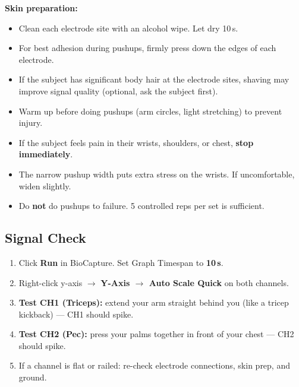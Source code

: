 \documentclass[11pt,letterpaper]{article}
\begin{document}
\textbf{Skin preparation:}
\begin{itemize}[nosep]
    \item Clean each electrode site with an alcohol wipe.  Let dry 10\,s.
    \item For best adhesion during pushups, firmly press down the edges of each electrode.
    \item If the subject has significant body hair at the electrode sites, shaving may improve signal quality (optional, ask the subject first).
\end{itemize}

\begin{warningbox}
\begin{itemize}[nosep]
    \item Warm up before doing pushups (arm circles, light stretching) to prevent injury.
    \item If the subject feels pain in their wrists, shoulders, or chest, \textbf{stop immediately}.
    \item The narrow pushup width puts extra stress on the wrists.  If uncomfortable, widen slightly.
    \item Do \textbf{not} do pushups to failure.  5 controlled reps per set is sufficient.
\end{itemize}
\end{warningbox}

\subsection{Signal Check}

\begin{enumerate}[nosep]
    \item Click \textbf{Run} in BioCapture.  Set Graph Timespan to \textbf{10\,s}.
    \item Right-click y-axis $\rightarrow$ \textbf{Y-Axis $\rightarrow$ Auto Scale Quick} on both channels.
    \item \textbf{Test CH1 (Triceps):} extend your arm straight behind you (like a tricep kickback) --- CH1 should spike.
    \item \textbf{Test CH2 (Pec):} press your palms together in front of your chest --- CH2 should spike.
    \item If a channel is flat or railed: re-check electrode connections, skin prep, and ground.
\end{enumerate}

\end{document}
